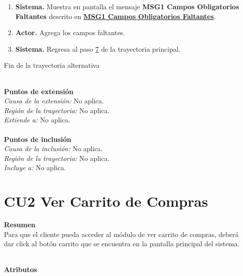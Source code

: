 \begin{itemize}
\begin{enumerate}
				\item \textbf{Sistema.} Muestra en pantalla el mensaje \textbf{MSG1 Campos Obligatorios Faltantes} descrito en \hyperlink{MSG1:CamposObligatorios}{\textbf{MSG1 Campos Obligatorios Faltantes}}. 
				
				\item \textbf{Actor.} Agrega los campos faltantes.
				
				\item \textbf{Sistema.} Regresa al paso \hyperlink{CU1:TP:P7}{7} de la trayectoria principal.
	
			\end{enumerate}
			
			Fin de la trayectoria alternativa
		

	\end{itemize}

	\noindent \textbf{\\Puntos de extensión}\\

		\noindent \textit{Causa de la extensión:} No aplica.\\
		\textit{Región de la trayectoria:} No aplica.\\
		\textit{Extiende a:} No aplica.\\

		
	\noindent \textbf{\\Puntos de inclusión}\\
	
		\noindent \textit{Causa de la inclusión:} No aplica.\\
		\textit{Región de la trayectoria:} No aplica.\\
		\textit{Incluye a:} No aplica.\\


\hypertarget{CU2}{}
\section{CU2 Ver Carrito de Compras}

\noindent \textbf{Resumen}\\

Para que el cliente pueda acceder al módulo de ver carrito de compras, deberá dar click al botón carrito que se encuentra en la pantalla principal del sistema.

\noindent \textbf{\\Atributos}

